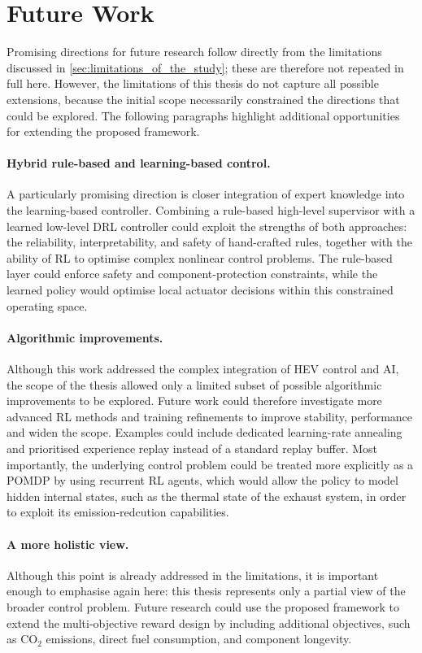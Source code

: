 \section{Future Work}
Promising directions for future research follow directly from the limitations discussed in \autoref{sec:limitations_of_the_study}; these are therefore not repeated in full here. However, the limitations of this thesis do not capture all possible extensions, because the initial scope necessarily constrained the directions that could be explored. The following paragraphs highlight additional opportunities for extending the proposed framework.

\paragraph{Hybrid rule-based and learning-based control.}
A particularly promising direction is closer integration of expert knowledge into the learning-based controller. Combining a rule-based high-level supervisor with a learned low-level \ac{DRL} controller could exploit the strengths of both approaches: the reliability, interpretability, and safety of hand-crafted rules, together with the ability of \ac{RL} to optimise complex nonlinear control problems. The rule-based layer could enforce safety and component-protection constraints, while the learned policy would optimise local actuator decisions within this constrained operating space.

\paragraph{Algorithmic improvements.}
Although this work addressed the complex integration of \ac{HEV} control and \ac{AI}, the scope of the thesis allowed only a limited subset of possible algorithmic improvements to be explored. Future work could therefore investigate more advanced \ac{RL} methods and training refinements to improve stability, performance and widen the scope. Examples could include dedicated learning-rate annealing and prioritised experience replay instead of a standard replay buffer. Most importantly, the underlying control problem could be treated more explicitly as a \ac{POMDP} by using recurrent \ac{RL} agents, which would allow the policy to model hidden internal states, such as the thermal state of the exhaust system, in order to exploit its emission-redcution capabilities.

\paragraph{A more holistic view.}
Although this point is already addressed in the limitations, it is important enough to emphasise again here: this thesis represents only a partial view of the broader control problem. Future research could use the proposed framework to extend the multi-objective reward design by including additional objectives, such as \(\mathrm{CO}_2\) emissions, direct fuel consumption, and component longevity.

